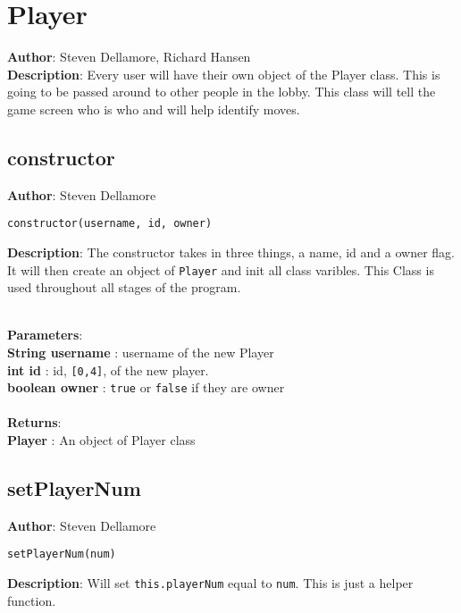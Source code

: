 \documentclass[12pt]{article}
\begin{document}
\section{Player}
\textbf{Author}: Steven Dellamore, Richard Hansen \\
\textbf{Description}: Every user will have their own object of the Player class. This is going to be passed around to other people in the lobby. This class will tell the game screen who is who and will help identify moves. \\



\subsection{constructor}
\textbf{Author}: Steven Dellamore 
\vspace*{1\baselineskip}
\begin{lstlisting}
constructor(username, id, owner)
\end{lstlisting} 
\vspace*{1\baselineskip}
\textbf{Description}: The constructor takes in three things, a name, id and a owner flag. It will then create an object of \texttt{Player} and init all class varibles. This Class is used throughout all stages of the program. 


\textbf{\large{\\Parameters}}:\\
\textbf{String username }: username of the new Player\\
\textbf{int id }: id, \texttt{[0,4]}, of the new player.\\
\textbf{boolean owner }: \texttt{true} or \texttt{false} if they are owner\\\textbf{\large{\\Returns}}:\\
\textbf{Player }: An object of Player class\\

\subsection{setPlayerNum}
\textbf{Author}: Steven Dellamore 
\vspace*{1\baselineskip}
\begin{lstlisting}
setPlayerNum(num)
\end{lstlisting} 
\vspace*{1\baselineskip}
\textbf{Description}: Will set \texttt{this.playerNum} equal to \texttt{num}. This is just a helper function. 
\end{document}

